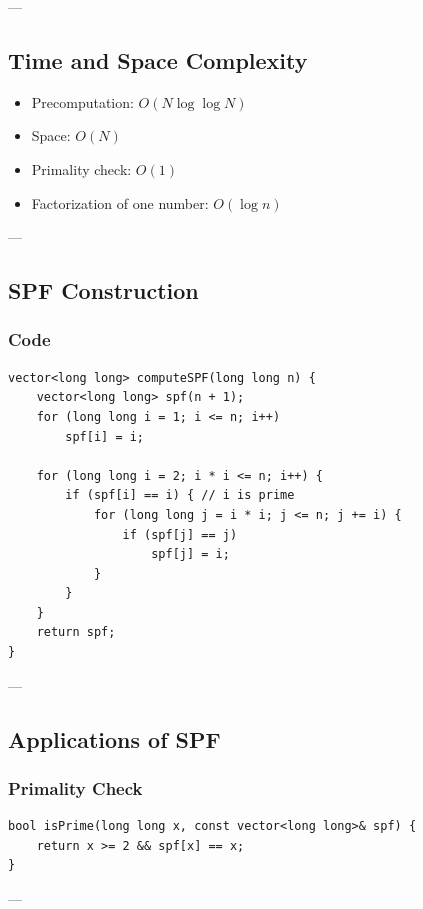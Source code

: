 \documentclass[11pt]{article}
\begin{document}
---

\subsection{Time and Space Complexity}

\begin{itemize}
    \item Precomputation: $O(N \log \log N)$
    \item Space: $O(N)$
    \item Primality check: $O(1)$
    \item Factorization of one number: $O(\log n)$
\end{itemize}

---

\subsection{SPF Construction}

\subsubsection{Code}
\begin{lstlisting}
vector<long long> computeSPF(long long n) {
    vector<long long> spf(n + 1);
    for (long long i = 1; i <= n; i++)
        spf[i] = i;

    for (long long i = 2; i * i <= n; i++) {
        if (spf[i] == i) { // i is prime
            for (long long j = i * i; j <= n; j += i) {
                if (spf[j] == j)
                    spf[j] = i;
            }
        }
    }
    return spf;
}
\end{lstlisting}

---

\subsection{Applications of SPF}

\subsubsection{Primality Check}

\begin{lstlisting}
bool isPrime(long long x, const vector<long long>& spf) {
    return x >= 2 && spf[x] == x;
}
\end{lstlisting}

---
\end{document}
